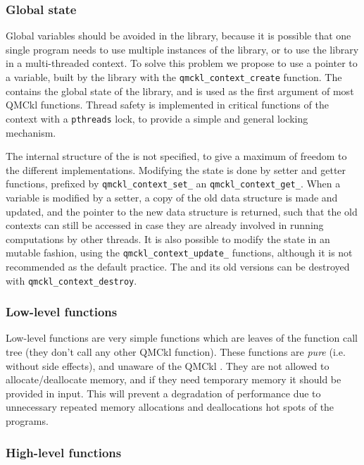 \subsubsection{Global state}

Global variables should  be avoided in the library,  because it is
possible that one  single program needs to  use multiple instances
of the library, or to use the library in a multi-threaded context.
To solve this  problem we propose to use a pointer
to a {\context}  variable,  built   by  the  library   with  the
\texttt{qmckl_context_create} function. The
{\context} contains the global state of the library, and is used as
the first argument of most \ac{QMCkl} functions. Thread safety is 
implemented in critical functions of the context with a
\texttt{pthreads} lock, to provide a simple and general locking
mechanism.

The internal structure of the {\context}  is not specified, to give a
maximum of  freedom to  the different  implementations.  Modifying
the  state   is  done   by  setter   and  getter functions,   prefixed  by
\texttt{qmckl_context_set_}  an
\texttt{qmckl_context_get_}.
When a {\context} variable is modified by a setter, a copy of the old
data structure is made and updated, and the pointer to the new data
structure is returned, such that the old contexts can still be
accessed in case they are already involved in running computations by
other threads. It is also possible to modify the state in an mutable
fashion, using the \texttt{qmckl_context_update_} functions,
although it is not recommended as the default practice.
The {\context} and its old versions can be destroyed with
\texttt{qmckl_context_destroy}.


\subsubsection{Low-level functions}

Low-level functions are very simple functions which are leaves of
the function call tree (they don't call any other \ac{QMCkl} function).
These  functions   are   \emph{pure} (i.e. without side effects), and
unaware of the \ac{QMCkl} {\context}. They are not allowed to
allocate/deallocate memory, and if they need temporary memory it
should be provided in input. This will prevent a degradation of
performance due to unnecessary repeated memory allocations and
deallocations hot spots of the programs.


\subsubsection{High-level functions}

